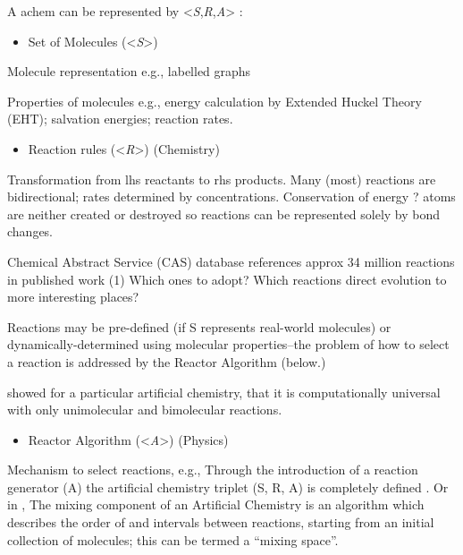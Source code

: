 A \gls{achem} can be represented by
\textless{}\emph{S},\emph{R},\emph{A}\textgreater{}
\autocite{Dittrich:2001zr}:

\begin{itemize}
	\item
 Set of Molecules (\textless{}\emph{S}\textgreater{})
\end{itemize}

Molecule representation e.g., labelled graphs

Properties of molecules e.g., energy calculation by Extended Huckel
Theory (EHT); salvation energies; reaction rates.

\begin{itemize}
	\item
 Reaction rules (\textless{}\emph{R}\textgreater{}) (Chemistry)
\end{itemize}

Transformation from lhs reactants to rhs products. Many (most) reactions
are bidirectional; rates determined by concentrations. Conservation of
energy ? atoms are neither created or destroyed so reactions can be
represented solely by bond changes.

Chemical Abstract Service (CAS) database references approx 34 million
reactions in published work (1) Which ones to adopt? Which reactions
direct evolution to more interesting places?

Reactions may be pre-defined (if S represents real-world molecules) or
dynamically-determined using molecular properties--the problem of how
to select a reaction is addressed by the Reactor Algorithm (below.)

\autocite{Tominaga2007} showed for a particular artificial chemistry,
that it is computationally universal with only unimolecular and
bimolecular reactions.

\begin{itemize}
	\item
 Reactor Algorithm (\textless{}\emph{A}\textgreater{}) (Physics)
\end{itemize}

Mechanism to select reactions, e.g., Through the introduction of a
reaction generator (A) the artificial chemistry triplet (S, R, A) is
completely defined \autocite{Lenaerts2009}. Or in
\autocite[sect. 4.1.3]{Faulconbridge2011}, The mixing component of an
Artificial Chemistry is an algorithm which describes the order of and
intervals between reactions, starting from an initial collection of
molecules; this can be termed a ``mixing space''.

